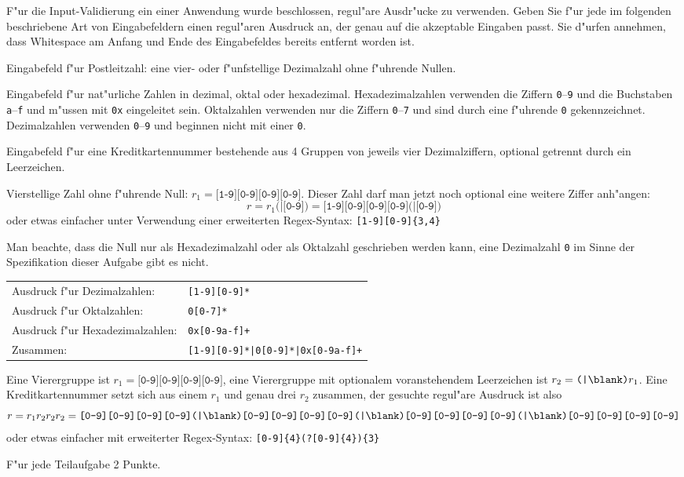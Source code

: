 F"ur die Input-Validierung ein einer Anwendung wurde beschlossen,
regul"are Ausdr"ucke zu verwenden.
Geben Sie f"ur jede im folgenden beschriebene Art von Eingabefeldern
einen regul"aren Ausdruck an, der genau auf die akzeptable Eingaben passt.
Sie d"urfen annehmen, dass Whitespace am Anfang und Ende des Eingabefeldes
bereits entfernt worden ist.
\begin{teilaufgaben}
\item Eingabefeld f"ur Postleitzahl: eine vier- oder f"unfstellige Dezimalzahl
ohne f"uhrende Nullen.
\item Eingabefeld f"ur nat"urliche Zahlen in dezimal, oktal oder hexadezimal.
Hexadezimalzahlen verwenden die Ziffern \texttt{0}--\texttt{9} und die
Buchstaben \texttt{a}--\texttt{f} und m"ussen mit \texttt{0x} eingeleitet
sein.
Oktalzahlen verwenden nur die Ziffern \texttt{0}--\texttt{7} und sind
durch eine f"uhrende \texttt{0} gekennzeichnet.
Dezimalzahlen verwenden \texttt{0}--\texttt{9} und beginnen nicht mit einer
\texttt{0}.
\item Eingabefeld f"ur eine Kreditkartennummer bestehende aus 4 Gruppen
von jeweils vier Dezimalziffern, optional getrennt durch ein Leerzeichen.
\end{teilaufgaben}

\begin{loesung}
\begin{teilaufgaben}
\item 
Vierstellige Zahl ohne f"uhrende Null:
$r_1 = \texttt{[1-9][0-9][0-9][0-9]}$.
Dieser Zahl darf man jetzt noch optional eine weitere Ziffer anh"angen:
\[
r=r_1\texttt{(|[0-9])}
=
\texttt{[1-9][0-9][0-9][0-9](|[0-9])}
\]
oder etwas einfacher unter Verwendung einer erweiterten Regex-Syntax:
\texttt{[1-9][0-9]\{3,4\}}
\item
Man beachte, dass die Null nur als Hexadezimalzahl oder als Oktalzahl
geschrieben werden kann, eine Dezimalzahl \texttt{0} im Sinne der Spezifikation
dieser Aufgabe gibt es nicht.
\begin{center}
\begin{tabular}{ll}
Ausdruck f"ur Dezimalzahlen:&\texttt{[1-9][0-9]*}\\
Ausdruck f"ur Oktalzahlen:&\texttt{0[0-7]*}\\
Ausdruck f"ur Hexadezimalzahlen:&\texttt{0x[0-9a-f]+}\\
Zusammen:&\texttt{[1-9][0-9]*|0[0-9]*|0x[0-9a-f]+}
\end{tabular}
\end{center}
\end{teilaufgaben}
\item Eine Vierergruppe ist $r_1 = \texttt{[0-9][0-9][0-9][0-9]}$,
eine Vierergruppe mit optionalem voranstehendem Leerzeichen ist
$r_2 = \texttt{(|\blank)}r_1$.
Eine Kreditkartennummer setzt sich aus einem $r_1$ und genau drei
$r_2$ zusammen, der gesuchte regul"are Ausdruck ist also
\[
r = r_1r_2r_2r_2 = 
\texttt{[0-9][0-9][0-9][0-9]%
(|\blank)[0-9][0-9][0-9][0-9]%
(|\blank)[0-9][0-9][0-9][0-9]%
(|\blank)[0-9][0-9][0-9][0-9]}
\]
oder etwas einfacher mit erweiterter Regex-Syntax:
\texttt{[0-9]\{4\}(\blank?[0-9]\{4\})\{3\}}
\end{loesung}

\begin{bewertung}
F"ur jede Teilaufgabe 2 Punkte.
\end{bewertung}

